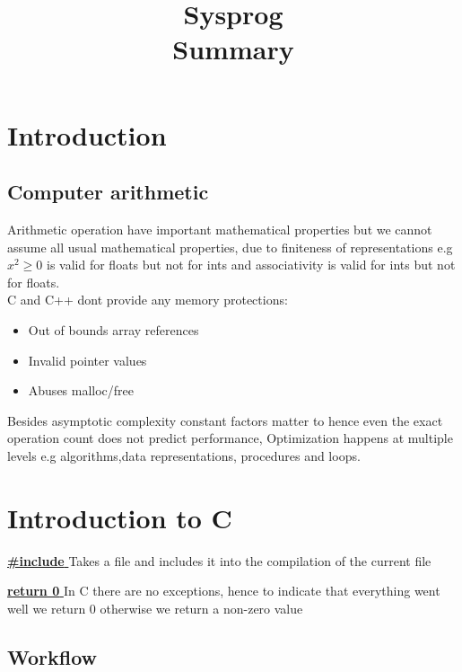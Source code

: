 \documentclass[8pt]{extreport}
\title{Sysprog\\Summary}
\begin{document}
	\maketitle
	\newpage
\tableofcontents
 \chapter{Introduction}

\section{Computer arithmetic}

Arithmetic operation have important mathematical properties but we cannot assume all usual mathematical properties, due to finiteness of representations e.g $x^2 \geq 0$ is valid for floats but not for ints and associativity is valid for ints but not for floats.\\

C and C++ dont provide any memory protections:
\begin{itemize}
\item Out of bounds array references
\item Invalid pointer values
\item Abuses malloc/free
\end{itemize}
Besides asymptotic complexity constant factors matter to hence even the exact operation count does not predict performance, Optimization happens at multiple levels e.g algorithms,data representations, procedures and loops.


\chapter{ Introduction to C }

\underline{\textbf{\#include }} Takes a file and includes it into the compilation of the current file

\underline{\textbf{return 0 }} In C there are no exceptions, hence to indicate that everything went well we return 0 otherwise we return a non-zero value

\section{Workflow}
\end{document}
